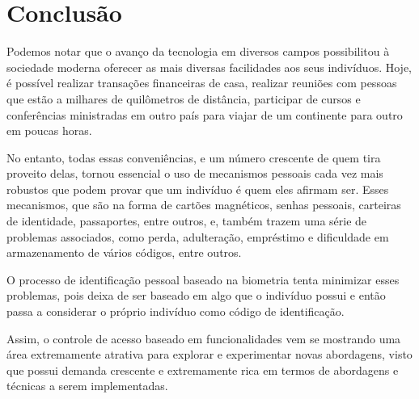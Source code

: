 \chapter{Conclusão}\label{cap:conclusoeseperspectivas}

Podemos notar que o avanço da tecnologia em diversos campos possibilitou 
à sociedade moderna oferecer as mais diversas facilidades aos 
seus indivíduos. Hoje, é possível realizar transações financeiras de casa, 
realizar reuniões com pessoas que estão a milhares de quilômetros de distância, 
participar de cursos e conferências ministradas em outro país para viajar de um 
continente para outro em poucas horas.

No entanto, todas essas conveniências, e um número crescente de quem tira proveito 
delas, tornou essencial o uso de mecanismos pessoais cada vez mais robustos que 
podem provar que um indivíduo é quem eles afirmam ser. Esses mecanismos, que são 
na forma de cartões magnéticos, senhas pessoais, carteiras de identidade, 
passaportes, entre outros, e, também trazem uma série de problemas associados, 
como perda, adulteração, empréstimo e dificuldade em armazenamento de vários 
códigos, entre outros.

O processo de identificação pessoal baseado na biometria tenta minimizar esses 
problemas, pois deixa de ser baseado em algo que o indivíduo possui e então 
passa a considerar o próprio indivíduo como código de identificação.

Assim, o controle de acesso baseado em funcionalidades vem se mostrando uma área 
extremamente atrativa para explorar e experimentar novas abordagens, visto que 
possui demanda crescente e extremamente rica em termos de abordagens e técnicas a 
serem implementadas.
